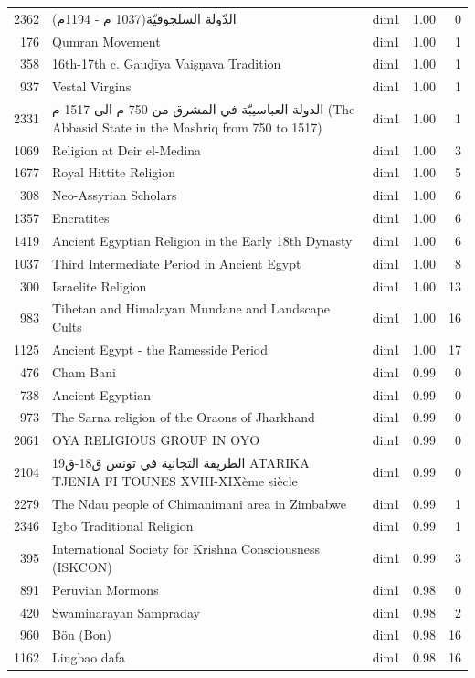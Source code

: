 \begin{tabular}{rllrr}
2362 & الدّولة السلجوقيّة(1037 م - 1194م) & dim1 & 1.00 & 0 \\
176 & Qumran Movement & dim1 & 1.00 & 1 \\
358 & 16th-17th c. Gauḍīya Vaiṣṇava Tradition & dim1 & 1.00 & 1 \\
937 & Vestal Virgins & dim1 & 1.00 & 1 \\
2331 & الدولة العباسيبّة في المشرق  من 750 م الى 1517 م (The Abbasid State in the Mashriq from 750 to 1517) & dim1 & 1.00 & 1 \\
1069 & Religion at Deir el-Medina & dim1 & 1.00 & 3 \\
1677 & Royal Hittite Religion & dim1 & 1.00 & 5 \\
308 & Neo-Assyrian Scholars & dim1 & 1.00 & 6 \\
1357 & Encratites & dim1 & 1.00 & 6 \\
1419 & Ancient Egyptian Religion in the Early 18th Dynasty & dim1 & 1.00 & 6 \\
1037 & Third Intermediate Period in Ancient Egypt & dim1 & 1.00 & 8 \\
300 & Israelite Religion & dim1 & 1.00 & 13 \\
983 & Tibetan and Himalayan Mundane and Landscape Cults & dim1 & 1.00 & 16 \\
1125 & Ancient Egypt - the Ramesside Period & dim1 & 1.00 & 17 \\
476 & Cham Bani & dim1 & 0.99 & 0 \\
738 & Ancient Egyptian & dim1 & 0.99 & 0 \\
973 & The Sarna religion of the Oraons of Jharkhand & dim1 & 0.99 & 0 \\
2061 & OYA RELIGIOUS GROUP IN OYO & dim1 & 0.99 & 0 \\
2104 & الطريقة التجانية في تونس ق18-ق19 ATARIKA TJENIA FI TOUNES  XVIII-XIXème siècle & dim1 & 0.99 & 0 \\
2279 & The Ndau people of Chimanimani area in Zimbabwe & dim1 & 0.99 & 1 \\
2346 & Igbo Traditional Religion & dim1 & 0.99 & 1 \\
395 & International Society for Krishna Consciousness (ISKCON) & dim1 & 0.99 & 3 \\
891 & Peruvian Mormons & dim1 & 0.98 & 0 \\
420 & Swaminarayan Sampraday & dim1 & 0.98 & 2 \\
960 & Bön (Bon) & dim1 & 0.98 & 16 \\
1162 & Lingbao dafa & dim1 & 0.98 & 16 \\

\end{tabular}
